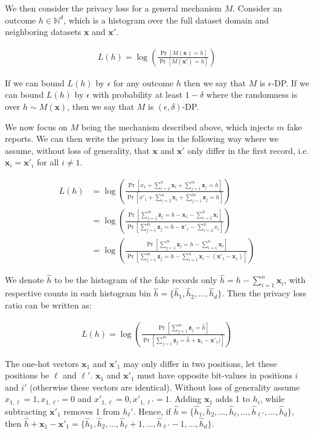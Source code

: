 \documentclass[11pt]{article}
\newcommand{\bbx}{\pmb{x}}
\newcommand{\bbz}{\pmb{z}}
\newcommand{\N}{\mathbb{N}}
\begin{document}
We then consider the privacy loss for a general mechanism $M$. Consider an outcome $h \in \N^d$, which is a histogram over the full dataset domain and neighboring datasets $\bbx$ and $\bbx'$.

\begin{align}
L(h) = \log \left ( \frac{\Pr[M(\bbx) = h]}{\Pr[M(\bbx') = h]} \right )
\end{align}

If we can bound $L(h)$ by $\epsilon$ for any outcome $h$ then we say that $M$ is $\epsilon$-DP. If we can bound $L(h)$ by $\epsilon$ with probability at least $1 - \delta$ where the randomness is over $h \sim M(\bbx)$, then we say that $M$ is $(\epsilon, \delta)$-DP.

We now focus on $M$ being the mechanism described above, which injects $m$ fake reports. We can then write the privacy loss in the following way where we assume, without loss of generality, that $\bbx$ and $\bbx'$ only differ in the first record, i.e. $\bbx_i = \bbx'_i$ for all $i \ne 1$.

\begin{align*}
L(h) &= \log \left ( \frac{\Pr[x_1 + \sum^n_{i=2} \bbx_i + \sum^m_{j=1} \bbz_j = h]}{\Pr[x'_1 + \sum^n_{i=2} \bbx_i + \sum^m_{j=1} \bbz_j = h]} \right ) \\
&=  \log \left ( \frac{\Pr[\sum^m_{j=1} \bbz_j = h - \bbx_1 - \sum^n_{i=2} \bbx_i ]}{\Pr[ \sum^m_{j=1} \bbz_j = h - \bbx'_1 - \sum^n_{i=2} x_i ]} \right )  \\
&=  \log \left ( \frac{\Pr[\sum^m_{j=1} \bbz_j = h - \sum^n_{i=1}  \bbx_i ]}{\Pr[ \sum^m_{j=1} \bbz_j = h  - \sum^n_{i=1} \bbx_i  - (\bbx'_1 - \bbx_1) ]} \right )
\end{align*}

We denote  $\hat{h}$ to be the histogram of the fake records only $\hat{h} = h - \sum^n_{i=1} \bbx_i$, with respective counts in each histogram bin $\hat{h} = \{ \hat{h}_1, \hat{h}_2, \dots , \hat{h}_d\}$.  Then the privacy loss ratio can be written as:

\begin{align*}
L(h) =  \log \left ( \frac{\Pr[\sum^m_{j=1} \bbz_j = \hat{h} ]}{\Pr[ \sum^m_{j=1} \bbz_j = \hat{h}  + \bbx_1 - \bbx'_1) ]} \right )
\end{align*}


The one-hot vectors $\bbx_1$  and $\bbx'_1$ may only differ in two positions, let these positions be $\ell$ and $\ell'$. 
$\bbx_1$ and $\bbx'_1$ must have opposite bit-values in positions $i$ and $i'$ (otherwise these vectors are identical). 
Without loss of generality assume $x_{1,\ell} = 1, x_{1,\ell'} = 0$ and $x'_{1,\ell} = 0, x'_{1,\ell'} = 1$.  
Adding $\bbx_1$ adds 1 to $h_i$, while subtracting $\bbx'_1$ removes 1 from $h_\ell'$.
Hence,  if $\hat{h} = \{ \hat{h}_1, \hat{h}_2, \dots , \hat{h}_\ell, \dots, \hat{h}_{\ell'}, \dots, \hat{h}_d\} $, then  $\hat{h} + \bbx_1 -\bbx'_1 =  \{ \hat{h}_1, \hat{h}_2, \dots , \hat{h}_\ell + 1, \dots, \hat{h}_{\ell'} -1, \dots, \hat{h}_d\} $.
\end{document}
